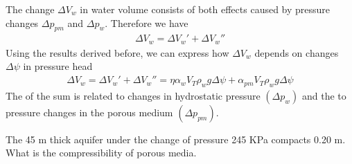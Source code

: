 \documentclass[letterpaper,10pt,english]{jupyterBook}
\begin{document}
\sphinxAtStartPar
The  change \(\Delta V_w\) in water volume consists of both effects caused by pressure changes \(\Delta p_{pm}\) and \(\Delta p_w\). Therefore we have
\begin{equation*}
\begin{split}
\Delta V_w = \Delta V_w' + \Delta V_w''
\end{split}
\end{equation*}
\sphinxAtStartPar
Using the results derived before, we can express how \(\Delta V_w\) depends on changes \(\Delta \psi\) in pressure head
\begin{equation*}
\begin{split}
\Delta V_w = \Delta V_w' + \Delta V_w'' = \eta \alpha_w V_T \rho_w g \Delta \psi + \alpha_{pm} V_T \rho_w g \Delta \psi
\end{split}
\end{equation*}
\sphinxAtStartPar
The  of the sum is related to changes in hydrostatic pressure \((\Delta p_w)\) and the  to pressure changes in the porous medium \((\Delta p_{pm})\).

\sphinxAtStartPar
{} The 45 m thick aquifer under the change of pressure 245 KPa compacts 0.20 m. What is the compressibility of porous media.
\end{document}
